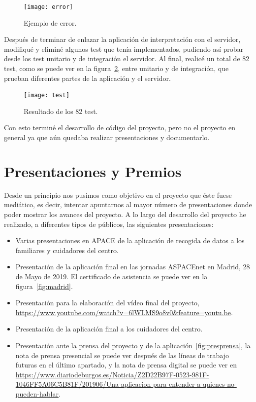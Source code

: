 \begin{figure}
	\centering
	\texttt{[image: error]}
	\caption{Ejemplo de error.}
	\label{fig:error}
\end{figure}

Después de terminar de enlazar la aplicación de interpretación con el servidor, modifiqué y eliminé algunos test que tenía implementados, pudiendo así probar desde los test unitario y de integración el servidor. Al final, realicé un total de 82 test, como se puede ver en la figura~\ref{fig:test}, entre unitario y de integración, que prueban diferentes partes de la aplicación y el servidor.

\begin{figure}
	\centering
	\texttt{[image: test]}
	\caption{Resultado de los 82 test.}
	\label{fig:test}
\end{figure}

Con esto terminé el desarrollo de código del proyecto, pero no el proyecto en general ya que aún quedaba realizar presentaciones y documentarlo.

\section{Presentaciones y Premios}
Desde un principio nos pusimos como objetivo en el proyecto que éste fuese mediático, es decir, intentar apuntarnos al mayor número de presentaciones donde poder mostrar los avances del proyecto. A lo largo del desarrollo del proyecto he realizado, a diferentes tipos de públicos, las siguientes presentaciones:
\begin{itemize}
	\item Varias presentaciones en APACE de la aplicación de recogida de datos a los familiares y cuidadores del centro.
	\item Presentación de la aplicación final en las jornadas ASPACEnet en Madrid, 28 de Mayo de 2019. El certificado de asistencia se puede ver en la figura~\ref{fig:madrid}.
	\item Presentación para la elaboración del vídeo final del proyecto, \url{https://www.youtube.com/watch?v=6lWLMS9o8v0&feature=youtu.be}.
	\item Presentación de la aplicación final a los cuidadores del centro.
	\item Presentación ante la prensa del proyecto y de la aplicación~\ref{fig:presprensa}, la nota de prensa presencial se puede ver después de las líneas de trabajo futuras en el último apartado, y la nota de prensa digital se puede ver en  \url{https://www.diariodeburgos.es/Noticia/Z2D22B97F-0523-981F-1046FF5A06C5B81F/201906/Una-aplicacion-para-entender-a-quienes-no-pueden-hablar}.
\end{itemize}

